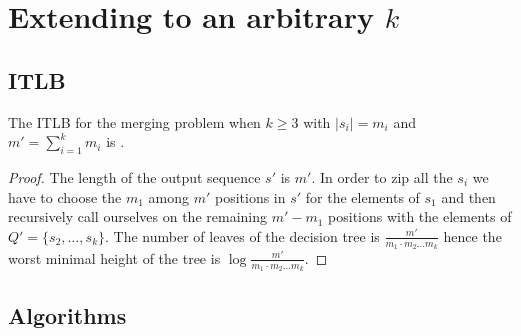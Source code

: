 \section{Extending to an arbitrary $k$}
\label{tree:merging:kgeq3}


\subsection{ITLB}
\label{tree:merging:kgeq3:ITLB}


\begin{theorem}
The ITLB for the merging problem when $k \geq 3$ with $|s_i| = m_i$ and $m' = \sum_{i=1}^{k} m_i$ is .
\end{theorem}

\begin{proof}
The length of the output sequence $s'$ is $m'$. In order to zip all the $s_i$ we have to choose the $m_1$ among $m'$ positions in $s'$ for the elements of $s_1$ and then recursively call ourselves on the remaining $m'-m_1$ positions with the elements of $Q' = \{s_2, \dots, s_k\}$. The number of leaves of the decision tree is $\frac{m'}{m_1 \cdot m_2 \dots m_k}$ hence the worst minimal height of the tree is $\log \frac{m'}{m_1 \cdot m_2 \dots m_k}$.
\end{proof}


\subsection{Algorithms}
\label{tree:merging:kgeq3:alg}